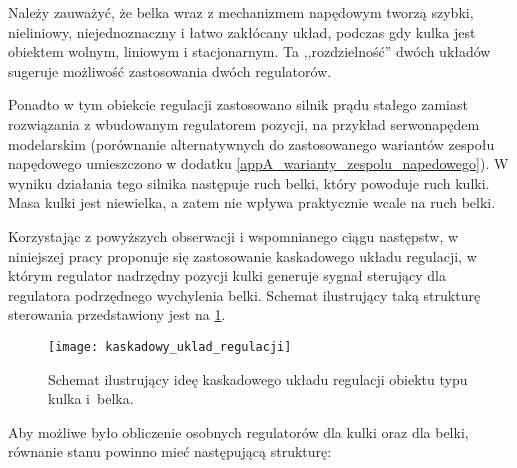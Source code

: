 Należy zauważyć, że belka wraz z mechanizmem napędowym tworzą szybki, nieliniowy, niejednoznaczny i łatwo zakłócany układ, podczas gdy kulka jest obiektem wolnym, liniowym i stacjonarnym. Ta ,,rozdzielność'' dwóch układów sugeruje możliwość zastosowania dwóch regulatorów.

Ponadto w tym obiekcie regulacji zastosowano silnik prądu stałego zamiast rozwiązania z wbudowanym regulatorem pozycji, na przykład serwonapędem modelarskim (porównanie alternatywnych do zastosowanego wariantów zespołu napędowego umieszczono w dodatku \ref{appA_warianty_zespolu_napedowego}). W wyniku dzia\-łania tego silnika następuje ruch belki, który powoduje ruch kulki. Masa kulki jest niewielka, a zatem nie wpływa praktycznie wcale na ruch belki.

Korzystając z powyższych obserwacji i wspomnianego ciągu następstw, w niniejszej pracy proponuje się zastosowanie kaskadowego układu regulacji, w którym regulator nadrzędny pozycji kulki generuje sygnał sterujący dla regulatora podrzędnego wychylenia belki. Schemat ilustrujący taką strukturę sterowania przedstawiony jest na \cref{fig:kaskadowy_uklad_regulacji}.

\begin{figure}[h]
    \centering
    \texttt{[image: kaskadowy\_uklad\_regulacji]}
    \caption{Schemat ilustrujący ideę kaskadowego układu regulacji obiektu typu kulka i~belka.}
    \label{fig:kaskadowy_uklad_regulacji}
\end{figure}

\pagebreak

Aby możliwe było obliczenie osobnych regulatorów dla kulki oraz dla belki, równanie stanu powinno mieć następującą strukturę:

